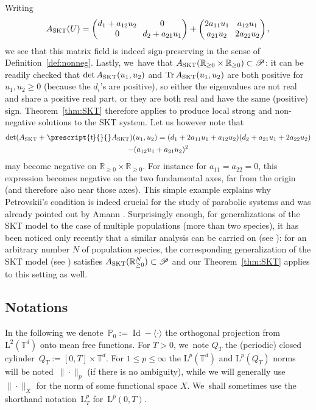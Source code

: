 \documentclass[JEP,XML,SOM,Unicode,published]{cedram}
\DeclareMathOperator{\Tr}{Tr}
\newcommand{\SKT}{\textup{SKT}}
\theoremstyle{definition}
\newcommand\R{\mathbb{R}}
\newcommand\T{\mathbb{T}}
\renewcommand\L{\mathrm{L}}
\DeclareMathOperator\Id{Id}
\newcommand*{\transp}[2][-2mu]{\ensuremath{\mskip1mu\prescript{\smash{\mathrm t\mkern#1}}{}{\mathstrut#2}}}%
\begin{document}
Writing
\[\arraycolsep3.5pt
A_{\SKT}(U)=
\begin{pmatrix} d_1+a_{12}u_2 & 0\\
0 & d_2+ a_{21}u_1
\end{pmatrix} +\begin{pmatrix} 2a_{11}u_1 & a_{12}u_1\\
a_{21}u_2 & 2 a_{22}u_2
\end{pmatrix},
\]
we see that this matrix field is indeed sign-preserving in the sense of Definition~\ref{def:nonneg}. Lastly, we~have that $A_{\SKT}(\R_{\geq 0}\times\R_{\geq 0})\subset\mathscr{P}$: it can be readily checked that $\det A_{\SKT}(u_1,u_2)$ and $\Tr A_{\SKT}(u_1,u_2)$ are both positive for $u_1,u_2\geq 0$ (because the $d_i$'s are positive), so either the eigenvalues are not real and share a positive real part, or they are both real and have the same (positive) sign. Theorem~\ref{thm:SKT} therefore applies to produce local strong and non-negative solutions to the SKT system.
Let us however note that
\begin{multline*}
\det(A_{\SKT}+\transp{}A_{\SKT})(u_1,u_2) = (d_1+2a_{11}u_1+a_{12}u_2)(d_2+a_{21}u_1+2a_{22}u_2)\\
-(a_{12} u_1+a_{21}u_2)^2
\end{multline*}
may become negative on $\R_{\geq 0}\times \R_{\geq 0}$. For instance for $a_{11}=a_{22}=0$, this expression becomes negative on the two fundamental axes, far from the origin (and therefore also near those axes). This simple example explains why Petrovskii's condition is indeed crucial for the study of parabolic systems and was already pointed out by Amann \cite{amann}. {Surprisingly enough, for generalizations of the SKT model to the case of multiple populations (more than two species), it has been noticed only recently that a similar analysis can be carried on (see \cite[\S 7]{chenjun2021}): for an arbitrary number $N$ of population species, the corresponding generalization of the SKT model (see \cite{chenjun2021}) satisfies $A_{\SKT}(\R_{\geq 0}^N)\subset\mathscr{P}$ and our Theorem~\ref{thm:SKT} applies to this setting as well.}

\subsection{Notations}\label{subsec:not}
In the following we denote~${\mathbb P}_0:= \Id-\langle \cdot\rangle$ the orthogonal projection from~$\L^2(\T^d)$ onto mean free functions. For $T>0$, we~note $Q_T$ the (periodic) closed cylinder~$Q_T:=[0,T]\times\T^d$. For $1\leq p \leq \infty$ the $\L^p(\T^d)$ and $\L^p(Q_T)$ norms will be noted~$\|{\cdot}\|_p$ (if there is no ambiguity), while we will generally use $\|{\cdot}\|_X$ for the norm of some functional space $X$. We~shall sometimes use the shorthand notation~$\L^p_T$ for~$\L^p(0,T)$.
\end{document}
